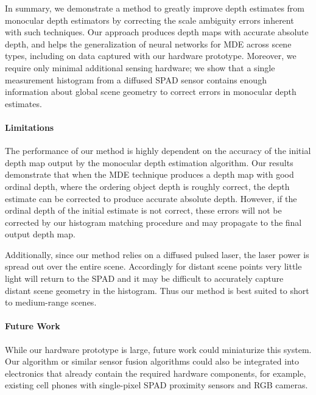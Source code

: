 In summary, we demonstrate a method to greatly improve depth estimates from
monocular depth estimators by correcting the scale ambiguity errors inherent
with such techniques.  Our approach produces depth maps with accurate absolute
depth, and helps the generalization of neural networks for MDE across scene
types, including on data captured with our hardware prototype.  Moreover, we
require only minimal additional sensing hardware; we show that a single measurement
histogram from a diffused SPAD sensor contains enough information about global
scene geometry to correct errors in monocular depth estimates.

\paragraph{Limitations}
The performance of our method is highly dependent on the accuracy of the initial depth map output by the monocular depth estimation algorithm.
Our results demonstrate that when the MDE technique produces a depth map
with good ordinal depth, where the ordering object depth is roughly correct, the
depth estimate can be corrected to produce accurate absolute depth. However, if the ordinal depth of the initial estimate is not correct, these errors will not be corrected by our histogram matching procedure and may propagate to the final output depth map.

Additionally, since our method relies on a diffused pulsed laser, the laser
power is spread out over the entire scene. Accordingly for distant scene points very
little light will return to the SPAD and it may be difficult to accurately
capture distant scene geometry in the histogram. Thus our method is best suited to short to medium-range scenes.

\paragraph{Future Work}
While our hardware prototype is large, future work could miniaturize this system. Our algorithm or similar sensor fusion algorithms could
also be integrated into electronics that already contain the required hardware
components, for example, existing cell phones with single-pixel SPAD
proximity sensors and RGB cameras.

